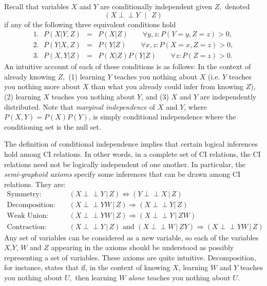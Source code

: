 \documentclass[12pt,onecolumn,nofootinbib]{revtex4-2}
\def\indep{\perp\!\!\!\!\perp}
\begin{document}
Recall that variables $X$ and $Y$ are
conditionally independent given $Z,$ denoted
\begin{equation*}
(X\indep Y\text{ }|\text{ }Z)
\end{equation*}%
if any of the following three equivalent conditions hold 
\begin{eqnarray*}
1.\text{ }P(X|Y,Z) &=&P(X|Z)\qquad\forall y,z:P(Y=y,Z=z)>0, \\
2.\text{ }P(Y|X,Z) &=&P(Y|Z)\qquad\forall x,z:P(X=x,Z=z)>0, \\
3.\text{ }P(X,Y|Z) &=&P(X|Z)P(Y|Z)\qquad\forall z: P(Z=z)>0.
\end{eqnarray*}%
An intuitive account of each of these conditions is as follows: In the
context of already knowing $Z,$ (1) learning $Y$ teaches you nothing about $%
X $ (i.e. $Y$ teaches you nothing more about $X$ than what you already could
infer from knowing $Z$), (2) learning $X$ teaches you nothing about $Y$, and
(3) $X$ and $Y$ are independently distributed.  Note that \emph{marginal independence} of $X$ and $Y$, where $P(X,Y)=P(X)P(Y)$, is simply conditional independence where the conditioning set is the null set.

The definition of conditional independence implies that certain logical inferences hold among CI relations. In other words, in a complete set of CI relations, the CI relations need not be logically independent of one another.  In particular, the
\emph{semi-graphoid axioms} specify some inferences that can be drawn among CI
relations. They are:
\begin{eqnarray*}
\mbox{Symmetry: } 		&&	(X\indep Y\, |\,Z) 		\Leftrightarrow 		(Y\indep X\, |\,Z)\\
\mbox{Decomposition: } 	&& 	(X\indep YW\,|\,Z) 	\Rightarrow 		(X \indep Y |\,Z) \\
\mbox{Weak Union: } 	&&	(X\indep YW\,|\,Z)	\Rightarrow 		(X \indep Y \,| \, ZW) \\
\mbox{Contraction: } 	&&	(X \indep Y\,|\,Z) 	\mbox{ and }		 	(X\indep W\, |\, ZY)	\Rightarrow (X\indep YW \,|\,Z)
\end{eqnarray*}
Any set of variables can be considered as a new variable, so each of the variables $X$,$Y$, $W$ and $Z$ appearing in the axioms should be understood as possibly representing a set of variables.  These axioms are quite intuitive.  Decomposition, for instance, states that if, in the context of knowing $X$,
learning $W$ and $Y$ teaches you nothing about $U,$ then learning $W$ \emph{
alone }teaches you nothing about $U$.
\end{document}
